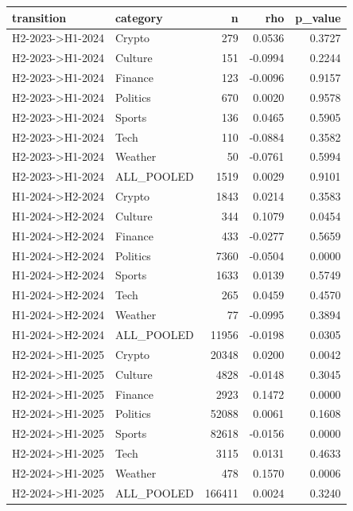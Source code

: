 \begin{tabular}{llrrr}
\toprule
transition & category & n & rho & p\_value \\
\midrule
H2-2023->H1-2024 & Crypto & 279 & 0.0536 & 0.3727 \\
H2-2023->H1-2024 & Culture & 151 & -0.0994 & 0.2244 \\
H2-2023->H1-2024 & Finance & 123 & -0.0096 & 0.9157 \\
H2-2023->H1-2024 & Politics & 670 & 0.0020 & 0.9578 \\
H2-2023->H1-2024 & Sports & 136 & 0.0465 & 0.5905 \\
H2-2023->H1-2024 & Tech & 110 & -0.0884 & 0.3582 \\
H2-2023->H1-2024 & Weather & 50 & -0.0761 & 0.5994 \\
H2-2023->H1-2024 & ALL\_POOLED & 1519 & 0.0029 & 0.9101 \\
H1-2024->H2-2024 & Crypto & 1843 & 0.0214 & 0.3583 \\
H1-2024->H2-2024 & Culture & 344 & 0.1079 & 0.0454 \\
H1-2024->H2-2024 & Finance & 433 & -0.0277 & 0.5659 \\
H1-2024->H2-2024 & Politics & 7360 & -0.0504 & 0.0000 \\
H1-2024->H2-2024 & Sports & 1633 & 0.0139 & 0.5749 \\
H1-2024->H2-2024 & Tech & 265 & 0.0459 & 0.4570 \\
H1-2024->H2-2024 & Weather & 77 & -0.0995 & 0.3894 \\
H1-2024->H2-2024 & ALL\_POOLED & 11956 & -0.0198 & 0.0305 \\
H2-2024->H1-2025 & Crypto & 20348 & 0.0200 & 0.0042 \\
H2-2024->H1-2025 & Culture & 4828 & -0.0148 & 0.3045 \\
H2-2024->H1-2025 & Finance & 2923 & 0.1472 & 0.0000 \\
H2-2024->H1-2025 & Politics & 52088 & 0.0061 & 0.1608 \\
H2-2024->H1-2025 & Sports & 82618 & -0.0156 & 0.0000 \\
H2-2024->H1-2025 & Tech & 3115 & 0.0131 & 0.4633 \\
H2-2024->H1-2025 & Weather & 478 & 0.1570 & 0.0006 \\
H2-2024->H1-2025 & ALL\_POOLED & 166411 & 0.0024 & 0.3240 \\
\bottomrule
\end{tabular}
